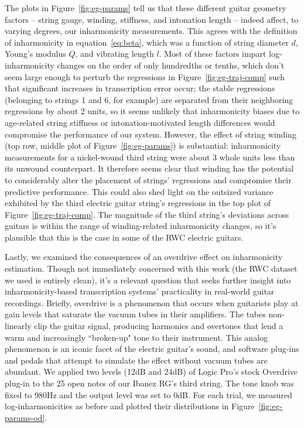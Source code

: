 \documentclass[12pt]{cmuthesis}
\begin{document}
The plots in Figure~\ref{fig:eg-params} tell us that these different guitar geometry factors -- string gauge, winding, stiffness, and intonation length -- indeed affect, to varying degrees, our inharmonicity measurements. This agrees with the definition of inharmonicity in equation~\eqref{eq:beta}, which was a function of string diameter $d$, Young's modulus $Q$, and vibrating length $l$. Most of these factors impart log-inharmonicity changes on the order of only hundredths or tenths, which don't seem large enough to perturb the regressions in Figure~\ref{fig:eg-traj-comp} such that significant increases in transcription error occur; the stable regressions (belonging to strings 1 and 6, for example) are separated from their neighboring regressions by about 2 units, so it seems unlikely that inharmonicity biases due to age-related string stiffness or intonation-motivated length differences would compromise the performance of our system. However, the effect of string winding (top row, middle plot of Figure~\ref{fig:eg-params}) is substantial: inharmonicity measurements for a nickel-wound third string were about 3 whole units less than its unwound counterpart. It therefore seems clear that winding has the potential to considerably alter the placement of strings' regressions and compromise their predictive performance. This could also shed light on the outsized variance exhibited by the third electric guitar string's regressions in the top plot of Figure~\ref{fig:eg-traj-comp}. The magnitude of the third string's deviations across guitars is within the range of winding-related inharmonicity changes, so it's plausible that this is the case in some of the RWC electric guitars.

Lastly, we examined the consequences of an overdrive effect on inharmonicity estimation. Though not immediately concerned with this work (the RWC dataset we used is entirely clean), it's a relevant question that seeks further insight into inharmonicity-based transcription systems' practicality in real-world guitar recordings. Briefly, overdrive is a phenomenon that occurs when guitarists play at gain levels that saturate the vacuum tubes in their amplifiers. The tubes non-linearly clip the guitar signal, producing harmonics and overtones that lend a warm and increasingly ``broken-up" tone to their instrument. This analog phenomenon is an iconic facet of the electric guitar's sound, and software plug-ins and pedals that attempt to simulate the effect without vacuum tubes are abundant. We applied two levels (12dB and 24dB) of Logic Pro's stock Overdrive plug-in to the 25 open notes of our Ibanez RG's third string. The tone knob was fixed to 980Hz and the output level was set to 0dB. For each trial, we measured log-inharmonicities as before and plotted their distributions in Figure~\ref{fig:eg-params-od}.
\end{document}
